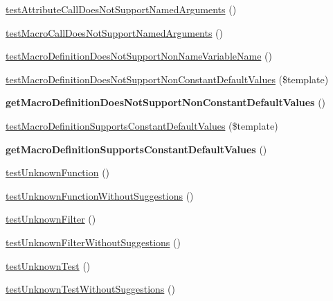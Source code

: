 \begin{DoxyCompactItemize}
\item 
\hyperlink{class_twig___tests___expression_parser_test_a08b78af5a9ddb15dcdee3d7e42769e86}{test\+Attribute\+Call\+Does\+Not\+Support\+Named\+Arguments} ()
\item 
\hyperlink{class_twig___tests___expression_parser_test_a5b030ef6fb1e06645ee0c0ad4452227d}{test\+Macro\+Call\+Does\+Not\+Support\+Named\+Arguments} ()
\item 
\hyperlink{class_twig___tests___expression_parser_test_aaf7bf57b8cff65d90b21c9677d056450}{test\+Macro\+Definition\+Does\+Not\+Support\+Non\+Name\+Variable\+Name} ()
\item 
\hyperlink{class_twig___tests___expression_parser_test_a5c1f7e93bacf644ff1b557928f5c3bda}{test\+Macro\+Definition\+Does\+Not\+Support\+Non\+Constant\+Default\+Values} (\$template)
\item 
{\bfseries get\+Macro\+Definition\+Does\+Not\+Support\+Non\+Constant\+Default\+Values} ()\hypertarget{class_twig___tests___expression_parser_test_aed204e4ee608bb62f16664c2f1911d3a}{}\label{class_twig___tests___expression_parser_test_aed204e4ee608bb62f16664c2f1911d3a}

\item 
\hyperlink{class_twig___tests___expression_parser_test_a3554697c006b9508429370d0bd51930d}{test\+Macro\+Definition\+Supports\+Constant\+Default\+Values} (\$template)
\item 
{\bfseries get\+Macro\+Definition\+Supports\+Constant\+Default\+Values} ()\hypertarget{class_twig___tests___expression_parser_test_aaf340c3f020984af70153016359a41c6}{}\label{class_twig___tests___expression_parser_test_aaf340c3f020984af70153016359a41c6}

\item 
\hyperlink{class_twig___tests___expression_parser_test_a9fb5d6b0eabcad029e4c87bf46cb3e23}{test\+Unknown\+Function} ()
\item 
\hyperlink{class_twig___tests___expression_parser_test_ad07939a935147d3d5e0f58dfbc7b3e10}{test\+Unknown\+Function\+Without\+Suggestions} ()
\item 
\hyperlink{class_twig___tests___expression_parser_test_affbfd8f816215a56f7d5ccfa9f536543}{test\+Unknown\+Filter} ()
\item 
\hyperlink{class_twig___tests___expression_parser_test_a2a71a9ad568873d976d9aaef4ea6a13f}{test\+Unknown\+Filter\+Without\+Suggestions} ()
\item 
\hyperlink{class_twig___tests___expression_parser_test_a48c71f6fa91666c24458fa1c81242670}{test\+Unknown\+Test} ()
\item 
\hyperlink{class_twig___tests___expression_parser_test_a1a8262152def8691752d7399d2d9b2d6}{test\+Unknown\+Test\+Without\+Suggestions} ()
\end{DoxyCompactItemize}


